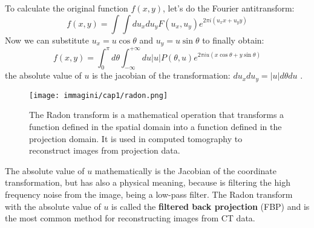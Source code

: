 To calculate the original function \( f(x,y) \), let's do the Fourier antitransform: 
\begin{equation}
    f(x,y) = \int \int du_x du_y F(u_x, u_y) e^{2\pi i (u_x x + u_y y)}
\end{equation}
Now we can substitute \( u_x = u \cos\theta \) and \( u_y = u \sin\theta \) to finally obtain:
\begin{equation}
    f(x,y) = \int_{0}^{\pi} d\theta \int_{-\infty}^{+\infty} du |u| P(\theta, u) e^{2\pi i u (x \cos\theta + y \sin\theta)} 
\end{equation}
the absolute value of \( u \) is the jacobian of the transformation: \( du_x du_y = |u| d\theta du \) .
\begin{figure}[h!]
    \centering
    \texttt{[image: immagini/cap1/radon.png]} 
    \caption{The Radon transform is a mathematical operation that transforms a function defined in the spatial domain into a function defined in the projection domain. It is used in computed tomography to reconstruct images from projection data.} 
    \label{fig:radon_transform}
\end{figure}

The absolute value of $u$ mathematically is the Jacobian of the coordinate transformation, but has also a physical meaning, because is filtering the high frequency noise from the image, being a low-pass filter.
The Radon transform with the absolute value of \( u \) is called the \textbf{filtered back projection} (FBP) and is the most common method for reconstructing images from CT data.



